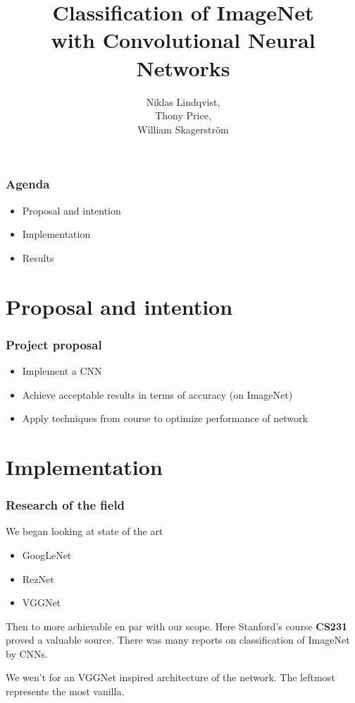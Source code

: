 \documentclass{beamer}
\title{
  Classification of ImageNet \\
  with Convolutional Neural Networks
}
\author{
  Niklas Lindqvist,\\
  Thony Price,\\
  William Skagerström\\
}
\begin{document}
\maketitle

\begin{frame}
  \frametitle{Agenda}

  \begin{itemize}
    \item Proposal and intention
    \item Implementation
    \item Results
  \end{itemize}
\end{frame}

\section{Proposal and intention}
\begin{frame}
  \frametitle{Project proposal}
  \begin{itemize}
	  \item Implement a CNN
    \item Achieve acceptable results in terms of accuracy (on ImageNet)
    \item Apply techniques from course to optimize performance of network
  \end{itemize}
\end{frame}

\section{Implementation}
\begin{frame}
  \frametitle{Research of the field}
  We began looking at state of the art
  \begin{itemize}
    \item GoogLeNet
    \item RezNet
    \item VGGNet
  \end{itemize}

  Then to more achievable en par with our scope. Here Stanford's course \textbf{CS231} proved a valuable source. There was many reports on classification of ImageNet by CNNs.
\end{frame}

\begin{frame}
  We wen't for an VGGNet inspired architecture of the network. The leftmost represents the most vanilla.
  
\end{frame}
\end{document}
